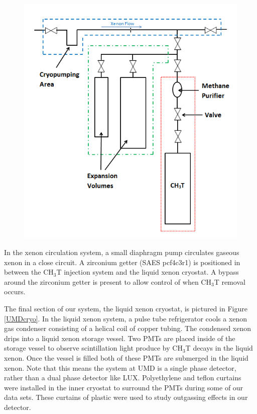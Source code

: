 \documentclass[a4paper,12pt]{article}
\begin{document}
{\begin{figure}
\includegraphics[scale=.6]{UMDInjectionSys.png} 
\label{UMDInjectionSystem}
\end{figure}


In the xenon circulation system, a small diaphragm pump circulates gaseous xenon in a close circuit.  A zirconium getter (SAES pcf4c3r1) is positioned in between the CH$_3$T injection system and the liquid xenon cryostat.  A bypass around the zirconium getter is present to allow control of when CH$_3$T removal occurs.

The final section of our system, the liquid xenon cryostat, is pictured in Figure \ref{UMDcryo}. In the liquid xenon system, a pulse tube refrigerator cools a xenon gas condenser consisting of a helical coil of copper tubing. The condensed xenon drips into a liquid xenon storage vessel. Two PMTs are placed inside of the storage vessel to observe scintillation light produce by CH$_3$T decays in the liquid xenon. Once the vessel is filled both of these PMTs are submerged in the liquid xenon. Note that this means the system at UMD is a single phase detector, rather than a dual phase detector like LUX. Polyethylene and teflon curtains were installed in the inner cryostat to surround the PMTs during some of our data sets. These curtains of plastic were used to study outgassing effects in our detector.

}
\end{document}
